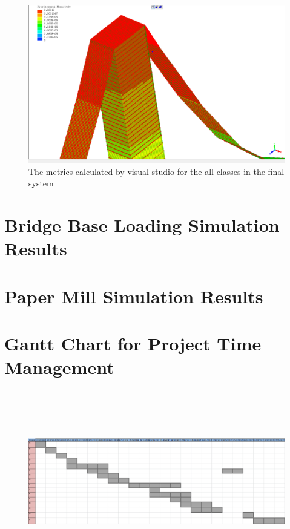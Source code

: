 \begin{figure}
  \centerline{\includegraphics[width=165mm, scale=0.5]{../Graphics/BridgeCrossLoading/aboveAverageRefinement.png}}
  \caption{The metrics calculated by visual studio for the all classes in the final system}
\end{figure}


\section{Bridge Base Loading Simulation Results}

\section{Paper Mill Simulation Results}

\newpage  
\section{Gantt Chart for Project Time Management}
\pagestyle{empty}
\begin{landscape}
\vspace*{1cm}
\hspace*{-3cm}
\begin{figure}
\includegraphics[width =700px, height=300px]{../Graphics/TimePlanUpdated2.png} \par
\end{figure}
\hspace*{-1cm}
\end{landscape}

